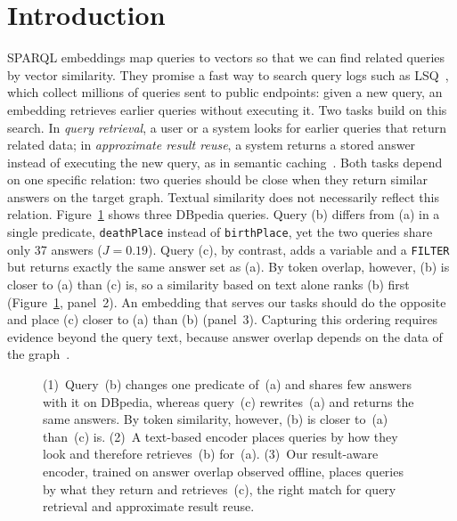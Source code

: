 \documentclass[runningheads]{llncs}
\begin{document}
\section{Introduction}
\label{sec:intro}

SPARQL embeddings map queries to vectors so that we can find related queries
by vector similarity. They promise a fast way to search query logs such as
LSQ~\cite{saleem2015lsq}, which collect millions of queries sent to public
endpoints: given a new query, an embedding retrieves earlier queries without
executing it. Two tasks build on this search. In \emph{query retrieval}, a
user or a system looks for earlier queries that return related data; in
\emph{approximate result reuse}, a system returns a stored answer instead of
executing the new query, as in semantic
caching~\cite{dar1996semanticcaching,papailiou2015caching}. Both tasks
depend on one specific relation: two queries should be close when they
return similar answers on the target graph.
Textual similarity does not necessarily reflect this relation. Figure~\ref{fig:gap}
shows three DBpedia queries. Query (b) differs from (a) in
a single predicate, \texttt{deathPlace} instead of \texttt{birthPlace}, yet
the two queries share only 37 answers ($J = 0.19$). Query (c), by contrast,
adds a variable and a \texttt{FILTER} but returns exactly the same answer set as (a). By token overlap, however, (b) is closer to (a) than (c) is, so a similarity based on text alone ranks (b) first (Figure~\ref{fig:gap}, panel~2). An embedding that serves our tasks should do the opposite and place (c) closer to (a) than (b) (panel~3).
Capturing this ordering requires evidence beyond the query text, because
answer overlap depends on the data of the graph~\cite{perez2009sparql}.

\begin{figure}[t]
\centering

\caption{\small{(1)~Query~(b)
changes one predicate of~(a) and shares few answers with it on DBpedia,
whereas query~(c) rewrites~(a) and returns the same answers. By token
similarity, however, (b) is closer to~(a) than~(c) is. (2)~A text-based
encoder places queries by how they look and therefore retrieves~(b) for~(a).
(3)~Our result-aware encoder, trained on answer overlap observed offline,
places queries by what they return and retrieves~(c), the right match for
query retrieval and approximate result reuse.}}
\label{fig:gap}
\end{figure}
\end{document}
